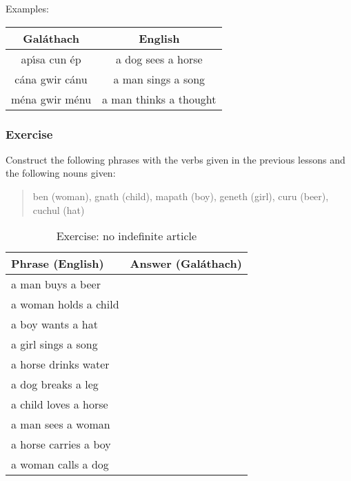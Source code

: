 Examples:
\begin{table}[H]
\centering
\begin{tabu}{c|c}
  \textbf{Gal\'{a}thach} & \textbf{English}\\
  \toprule
  ap\'{\i}sa cun \'{e}p & a dog sees a horse\\
  c\'{a}na gwir c\'{a}nu & a man sings a song\\
  m\'{e}na gwir m\'{e}nu & a man thinks a thought
\end{tabu}
\label{examples_vso_more_examples}
\end{table}

\newpage
\subsubsection{Exercise}

Construct the following phrases with the verbs given in the previous lessons and the following nouns given:

\begin{quote}
ben (woman), gnath (child), mapath (boy), geneth (girl), curu (beer), cuchul (hat)
\end{quote}

\begin{table}[H]
\centering
\begin{tabu}{|l|p{10.0cm}|}
  \toprule
  \textbf{Phrase (English)} & \textbf{Answer (Gal\'{a}thach)}\\
  \toprule
  a man buys a beer & \\
  \midrule
  a woman holds a child & \\
  \midrule
  a boy wants a hat & \\
  \midrule
  a girl sings a song & \\
  \midrule
  a horse drinks water & \\
  \midrule
  a dog breaks a leg & \\
  \midrule
  a child loves a horse & \\
  \midrule
  a man sees a woman & \\
  \midrule
  a horse carries a boy & \\
  \midrule
  a woman calls a dog & \\
  \bottomrule
\end{tabu}
\label{exercise_no_indefinite_article}
\caption{Exercise: no indefinite article}
\end{table}

